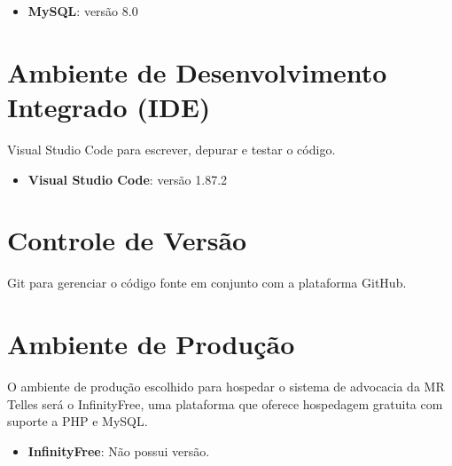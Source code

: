 \cite{milani2007mysql}

\begin{itemize}
    \item \textbf{MySQL}: versão 8.0
\end{itemize}
\vspace{\baselineskip}

\section{Ambiente de Desenvolvimento Integrado (IDE)}
Visual Studio Code para escrever, depurar e testar o código.

\begin{itemize}
    \item \textbf{Visual Studio Code}: versão 1.87.2
\end{itemize}
\vspace{\baselineskip}

\section{Controle de Versão}
Git para gerenciar o código fonte em conjunto com a plataforma GitHub.

\section{Ambiente de Produção}
O ambiente de produção escolhido para hospedar o sistema de advocacia da MR Telles será o InfinityFree, uma plataforma que oferece hospedagem gratuita com suporte a PHP e MySQL. 

\begin{itemize}
    \item \textbf{InfinityFree}: Não possui versão.
\end{itemize}

